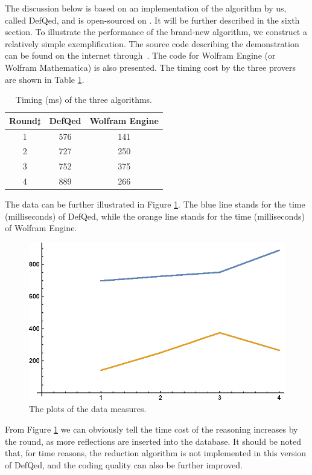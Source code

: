 \documentclass{aims}
\numberwithin{equation}{section}
\numberwithin{theorem}{section}	%
\numberwithin{axiom}{section}	%
\numberwithin{definition}{section}	%
\begin{document}
	The discussion below is based on an implementation of the algorithm by us, called DefQed, and is open-sourced on \cite{Wang2022}. It will be further described in the sixth section. To illustrate the performance of the brand-new algorithm, we construct a relatively simple exemplification. The source code describing the demonstration can be found on the internet through~\cite{Wang2022-2}. The code for Wolfram Engine (or Wolfram Mathematica) is also presented. The timing cost by the three provers are shown in Table \ref{table-2}.
	\begin{table}[H]
		\centering
		\caption{Timing (ms) of the three algorithms.}
		
		\begin{tabular}{ccc}  
		\toprule
			Round$\sharp$ & DefQed & Wolfram Engine \\
			\midrule
			1 & 576 & 141  \\ 
			2 & 727 & 250  \\ 
			3 & 752 & 375  \\ 
			4 & 889 & 266  \\ 
			\bottomrule
		\end{tabular}
		\label{table-2}
	\end{table}
	
	The data can be further illustrated in Figure \ref{figure-4}. The blue line stands for the time (milliseconds) of DefQed, while the orange line stands for the time (milliseconds) of Wolfram Engine.
	
	\begin{figure}[H]
		\centering
		\includegraphics{plot.eps}
		\caption{The plots of the data measures.}
		\label{figure-4}
	\end{figure}

	From Figure \ref{figure-4} we can obviously tell the time cost of the reasoning increases by the round, as more reflections are inserted into the database. It should be noted that, for time reasons, the reduction algorithm is not implemented in this version of DefQed, and the coding quality can also be further improved.
	 
\end{document}
